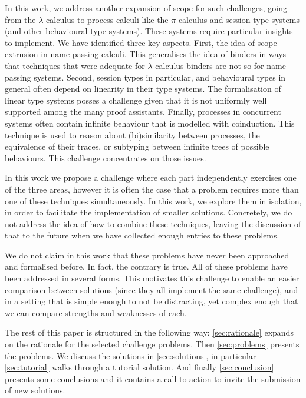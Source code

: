 \documentclass{article}
\begin{document}
In this work, we address another expansion of scope for such
challenges, going from the $\lambda$-calculus to process calculi like
the $\pi$-calculus and session type systems (and other behavioural
type systems). These systems require particular insights to implement.
We have identified three key aspects. First, the idea of scope
extrusion in name passing calculi. This generalises the idea of
binders in ways that techniques that were adequate for
$\lambda$-calculus binders are not so for name passing systems.
Second, session types in particular, and behavioural types in general
often depend on linearity in their type systems. The formalisation of
linear type systems posses a challenge given that it is not uniformly
well supported among the many proof assistants. Finally, processes in
concurrent systems often contain infinite behaviour that is modelled
with coinduction. This technique is used to reason about
(bi)similarity between processes, the equivalence of their traces, or
subtyping between infinite trees of possible behaviours. This
challenge concentrates on those issues.

In this work we propose a challenge where each part independently
exercises one of the three areas, however it is often the case that a
problem requires more than one of these techniques simultaneously. In
this work, we explore them in isolation, in order to facilitate the
implementation of smaller solutions. Concretely, we do not address the
idea of how to combine these techniques, leaving the discussion of
that to the future when we have collected enough entries to these
problems.

We do not claim in this work that these problems have never been
approached and formalised before. In fact, the contrary is true. All
of these problems have been addressed in several forms. This motivates
this challenge to enable an easier comparison between solutions (since
they all implement the same challenge), and in a setting that is
simple enough to not be distracting, yet complex enough that we can
compare strengths and weaknesses of each.

The rest of this paper is structured in the following way:
\cref{sec:rationale} expands on the rationale for the selected
challenge problems. Then \cref{sec:problems} presents the problems. We
discuss the solutions in \cref{sec:solutions}, in particular
\cref{sec:tutorial} walks through a tutorial solution. And finally
\cref{sec:conclusion} presents some conclusions and it contains a call
to action to invite the submission of new solutions.
\end{document}
